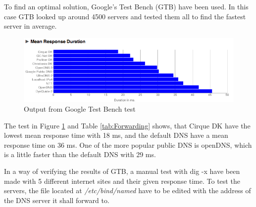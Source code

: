 \documentclass[a4paper,10pt]{report}
\newcommand{\code}[1]{{\fontfamily{pcr}\selectfont #1}}
\begin{document}
To find an optimal solution, Google's Test Bench (GTB) have been used.
In this case GTB looked up around 4500 servers and tested them all to find the fastest server in average.

\begin{figure}[H]
\centering
\includegraphics[scale=0.5]{Figurer/NamebenchTest.png}
\caption{Output from Google Test Bench test}
\label{fig:testBench}
\end{figure}

The test in Figure \ref{fig:testBench} and Table \ref{tab:Forwarding} shows, that Cirque DK have the lowest mean response time with 18 ms, and the default DNS have a mean response time on 36 ms. 
One of the more popular public DNS is openDNS, which is a little faster than the default DNS with 29 ms. 

In a way of verifying the results of GTB, a manual test with \code{dig -x} have been made with 5 different internet sites and their given response time. 
To test the servers, the file located at \textit{/etc/bind/named} have to be edited with the address of the DNS server it shall forward to. 
\end{document}

